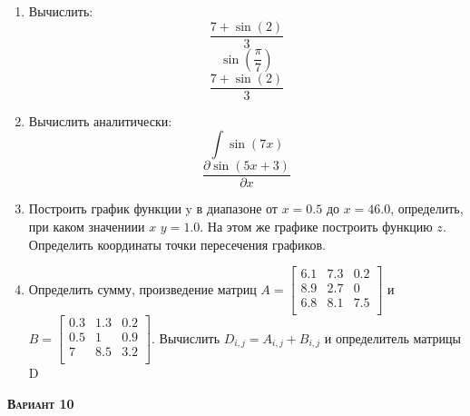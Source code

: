 \begin{enumerate}
\item Вычислить: 
\begin{equation*}\dfrac{7+\sin(2)}{3}              \end{equation*}
\begin{equation*}\sin \left( \dfrac{\pi}{7} \right)\end{equation*}
\begin{equation*}\dfrac{7+\sin(2)}{3}              \end{equation*}

\item Вычислить аналитически: 
 \begin{equation*} \int \sin(7x)           \end{equation*}\begin{equation*} {\dfrac{\partial \sin(5 x +3)}{\partial x}} \end{equation*}
\item Построить график функции y в диапазоне от $x=0.5$ до $x=46.0$, определить, при каком значениии $x$ $y=1.0$. На этом же графике построить функцию $z $. Определить координаты точки пересечения графиков. \item Определить сумму, произведение матриц $A=\begin{bmatrix}
6.1 &7.3 &0.2 \\
8.9 &2.7 &0 \\
6.8 &8.1 &7.5 \\
\end{bmatrix}
$ и $B=\begin{bmatrix}
0.3 &1.3 &0.2 \\
0.5 &1 &0.9 \\
7 &8.5 &3.2 \\
\end{bmatrix}
$. Вычислить $D_{i,j}=A_{i,j} + B_{i,j}$ и определитель матрицы D
\end{enumerate}
\textsc{\textbf{Вариант 10}}

